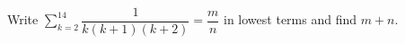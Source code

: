 Write $\displaystyle\sum_{k=2}^{14}\dfrac{1}{k(k+1)(k+2)}=\dfrac{m}{n}$ in lowest terms and find $m+n$.
